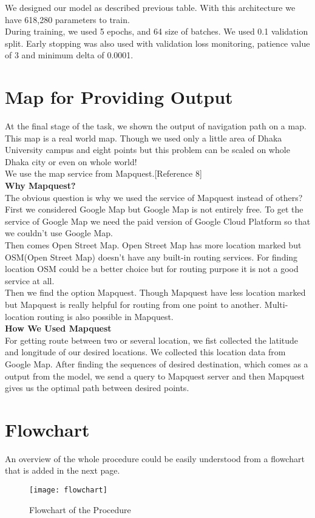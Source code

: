 We designed our model as described previous table. With this architecture we have 618,280 parameters to train. \\

During training, we used 5 epochs, and 64 size of batches. We used 0.1 validation split. Early stopping was also used with validation loss monitoring, patience value of 3 and minimum delta of 0.0001. \\



\section{Map for Providing Output}
At the final stage of the task, we shown the output of navigation path on a map. This map is a real world map. Though we used only a little area of Dhaka University campus and eight points but this problem can be scaled on whole Dhaka city or even on whole world! \\

We use the map service from Mapquest.[Reference 8] \\

\textbf{Why Mapquest?} \\
The obvious question is why we used the service of Mapquest instead of others? \\

First we considered Google Map but Google Map is not entirely free. To get the service of Google Map we need the paid version of Google Cloud Platform so that we couldn't use Google Map. \\

Then comes Open Street Map. Open Street Map has more location marked but OSM(Open Street Map) doesn't have any built-in routing services. For finding location OSM could be a better choice but for routing purpose it is not a good service at all. \\

Then we find the option Mapquest. Though Mapquest have less location marked but Mapquest is really helpful for routing from one point to another. Multi-location routing is also possible in Mapquest. \\

\textbf{How We Used Mapquest} \\
For getting route between two or several location, we fist collected the latitude and longitude of our desired locations. We collected this location data from Google Map. After finding the sequences of desired destination, which comes as a output from the model, we send a query to Mapquest server and then Mapquest gives us the optimal path between desired points. \\

\section{Flowchart}
An overview of the whole procedure could be easily understood from a flowchart that is added in the next page. \\

\begin{figure}[h]
    \centering
    \texttt{[image: flowchart]}
    \caption{Flowchart of the Procedure}
\end{figure}
\vline